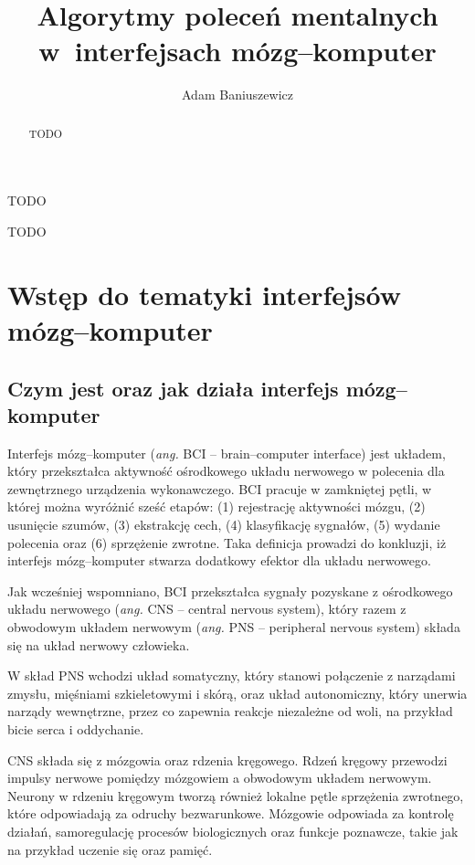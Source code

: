 \documentclass[skorowidz,skroty]{dyplomWEZUT}
\author{Adam Baniuszewicz}
\title{Algorytmy poleceń mentalnych w~interfejsach mózg--komputer}
\begin{document}
\begin{streszczenie}
TODO
\end{streszczenie}

\begin{abstract}
TODO
\end{abstract}

\maketitle

\begin{wprowadzenie}

TODO

\end{wprowadzenie}



\chapter{Wstęp do tematyki interfejsów mózg--komputer}
\section{Czym jest oraz jak działa interfejs mózg--komputer}
Interfejs mózg--komputer (\textit{ang.} BCI -- brain--computer interface) jest układem, który przekształca aktywność ośrodkowego układu nerwowego w polecenia dla zewnętrznego urządzenia wykonawczego. BCI pracuje w zamkniętej pętli, w której można wyróżnić sześć etapów: (1) rejestrację aktywności mózgu, (2) usunięcie szumów, (3) ekstrakcję cech, (4) klasyfikację sygnałów, (5) wydanie polecenia oraz (6) sprzężenie zwrotne\cite{bci_foundations}. Taka definicja prowadzi do konkluzji, iż interfejs mózg--komputer stwarza dodatkowy efektor dla układu nerwowego\cite{bci_principles}.

Jak wcześniej wspomniano, BCI przekształca sygnały pozyskane z ośrodkowego układu nerwowego (\textit{ang.} CNS -- central nervous system), który razem z obwodowym układem nerwowym (\textit{ang.} PNS -- peripheral nervous system) składa się na układ nerwowy człowieka.

W skład PNS wchodzi układ somatyczny, który stanowi połączenie z narządami zmysłu, mięśniami szkieletowymi i skórą, oraz układ autonomiczny, który unerwia narządy wewnętrzne, przez co zapewnia reakcje niezależne od woli, na przykład bicie serca i oddychanie\cite{bci_introduction}.

CNS składa się z mózgowia oraz rdzenia kręgowego. Rdzeń kręgowy przewodzi impulsy nerwowe pomiędzy mózgowiem a obwodowym układem nerwowym. Neurony w rdzeniu kręgowym tworzą również lokalne pętle sprzężenia zwrotnego, które odpowiadają za odruchy bezwarunkowe\cite{bci_introduction}. Mózgowie odpowiada za kontrolę działań, samoregulację procesów biologicznych oraz funkcje poznawcze, takie jak na przykład uczenie się oraz pamięć.
\end{document}

